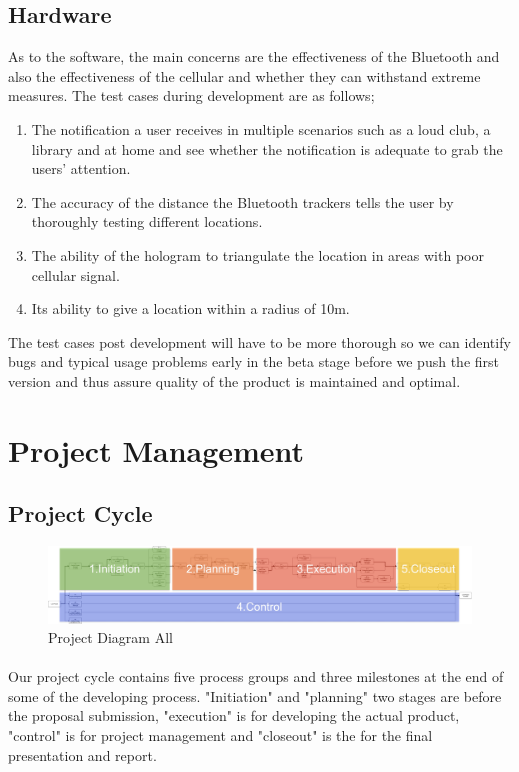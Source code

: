 \documentclass[12pt,a4paper]{article}
\begin{document}
      \subsection{Hardware}
      As to the software, the main concerns are the effectiveness of the Bluetooth and also the effectiveness of the cellular and whether they can withstand extreme measures. The test cases during development are as follows;
      \begin{enumerate}
        \item The notification a user receives in multiple scenarios such as a loud club, a library and at home and see whether the notification is adequate to grab the users’ attention.
        \item The accuracy of the distance the Bluetooth trackers tells the user by thoroughly testing different locations.
        \item The ability of the hologram to triangulate the location in areas with poor cellular signal.
        \item Its ability to give a location within a radius of 10m.
      \end{enumerate}
      The test cases post development will have to be more thorough so we can identify bugs and typical usage problems early in the beta stage before we push the first version and thus assure quality of the product is maintained and optimal.
          
    \section{Project Management}
      \subsection{Project Cycle}
      \begin{figure}[H]
        \centering
        \includegraphics[width=1\textwidth]{assets/9-project-diagram-all.jpg}
        \caption{Project Diagram All}
        \label{fig:Project Diagram All}
      \end{figure}
      \paragraph{}
        Our project cycle contains five process groups\cite{pmp} and three milestones at the end of some of the developing process. "Initiation" and "planning" two stages are before the proposal submission, "execution" is for developing the actual product, "control" is for project management and "closeout" is the for the final presentation and report.
      
\end{document}
